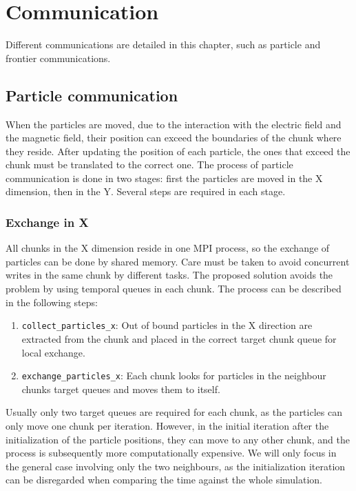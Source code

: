 \chapter{Communication}

Different communications are detailed in this chapter, such as particle and 
frontier communications.

\section{Particle communication}

When the particles are moved, due to the interaction with the electric field and 
the magnetic field, their position can exceed the boundaries of the chunk where 
they reside. After updating the position of each particle, the ones that exceed 
the chunk must be translated to the correct one. The process of particle 
communication is done in two stages: first the particles are moved in the X 
dimension, then in the Y. Several steps are required in each stage.

\subsection{Exchange in X}
All chunks in the X dimension reside in one MPI process, so the exchange of 
particles can be done by shared memory. Care must be taken to avoid concurrent 
writes in the same chunk by different tasks. The proposed solution avoids the 
problem by using temporal queues in each chunk. The process can be described in 
the following steps:
%
\begin{enumerate}
\item \texttt{collect\_particles\_x}: Out of bound particles in the X direction 
are extracted from the chunk and placed in the correct target chunk queue for 
local exchange.
\item \texttt{exchange\_particles\_x}: Each chunk looks for particles in the 
neighbour chunks target queues and moves them to itself.
\end{enumerate}
%
Usually only two target queues are required for each chunk, as the particles can 
only move one chunk per iteration. However, in the initial iteration after the 
initialization of the particle positions, they can move to any other chunk, and 
the process is subsequently more computationally expensive. We will only focus 
in the general case involving only the two neighbours, as the initialization 
iteration can be disregarded when comparing the time against the whole 
simulation.

